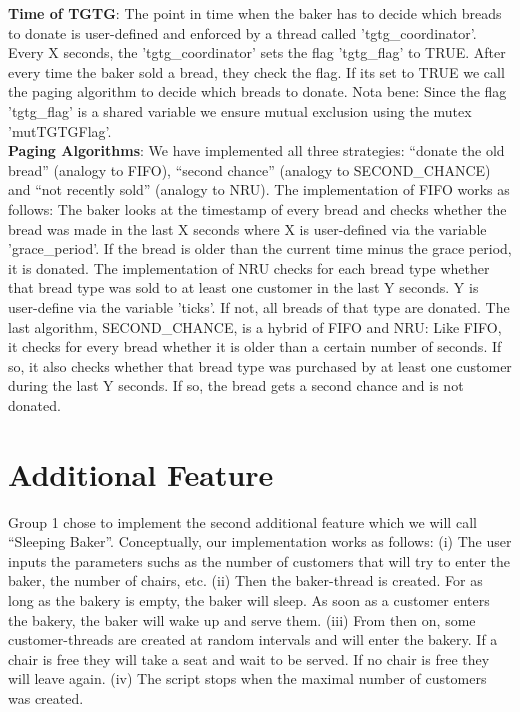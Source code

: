\documentclass[11pt]{article}
\begin{document}
\textbf{Time of TGTG}: The point in time when the baker has to decide which breads to donate is user-defined and enforced by a thread called 'tgtg\_coordinator'. Every X seconds, the 'tgtg\_coordinator' sets the flag 'tgtg\_flag' to TRUE. After every time the baker sold a bread, they check the flag. If its set to TRUE we call the paging algorithm to decide which breads to donate. Nota bene: Since the flag 'tgtg\_flag' is a shared variable we ensure mutual exclusion using the mutex 'mutTGTGFlag'.\\

\textbf{Paging Algorithms}: We have implemented all three strategies: ``donate the old bread'' (analogy to FIFO), ``second chance'' (analogy to SECOND\_CHANCE) and ``not recently sold'' (analogy to NRU). The implementation of FIFO works as follows: The baker looks at the timestamp of every bread and checks whether the bread was made in the last X seconds where X is user-defined via the variable 'grace\_period'. If the bread is older than the current time minus the grace period, it is donated. The implementation of NRU checks for each bread type whether that bread type was sold to at least one customer in the last Y seconds. Y is user-define via the variable 'ticks'. If not, all breads of that type are donated. The last algorithm, SECOND\_CHANCE, is a hybrid of FIFO and NRU: Like FIFO, it checks for every bread whether it is older than a certain number of seconds. If so, it also checks whether that bread type was purchased by at least one customer during the last Y seconds. If so, the bread gets a second chance and is not donated.\\

\section{Additional Feature}
\label{sec:orgf6aee47}

Group 1 chose to implement the second additional feature which we will call ``Sleeping Baker''. Conceptually, our implementation works as follows: (i) The user inputs the parameters suchs as the number of customers that will try to enter the baker, the number of chairs, etc. (ii) Then the baker-thread is created. For as long as the bakery is empty, the baker will sleep. As soon as a customer enters the bakery, the baker will wake up and serve them. (iii) From then on, some customer-threads are created at random intervals and will enter the bakery. If a chair is free they will take a seat and wait to be served. If no chair is free they will leave again. (iv) The script stops when the maximal number of customers was created.\\
\end{document}
